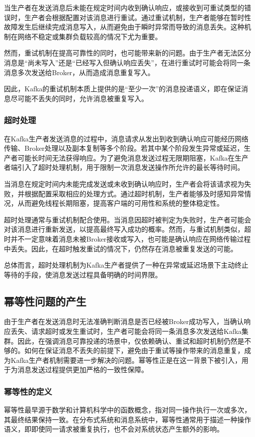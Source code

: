 当生产者在发送消息后未能在规定时间内收到确认响应，或接收到可重试类型的错误时，生产者会根据配置对该消息进行重试。通过重试机制，生产者能够在暂时性故障发生后继续完成消息写入，从而避免由于瞬时异常而导致的消息丢失。这种机制在网络不稳定或集群负载较高的情况下尤为重要。

然而，重试机制在提高可靠性的同时，也可能带来新的问题。由于生产者无法区分消息是“尚未写入”还是“已经写入但确认响应丢失”，在进行重试时可能会将同一条消息多次发送给Broker，从而造成消息重复写入。

因此，Kafka的重试机制本质上提供的是“至少一次”的消息投递语义，即在保证消息尽可能不丢失的同时，允许消息被重复写入。
    \subsubsection{超时处理}
在Kafka生产者发送消息的过程中，消息请求从发出到收到确认响应可能经历网络传输、Broker处理以及副本复制等多个阶段。若其中某个阶段发生异常或延迟，生产者可能长时间无法获得响应。为了避免消息发送过程无限期阻塞，Kafka在生产者端引入了超时处理机制，用于限制一次消息发送操作所允许的最长等待时间。

当消息在规定时间内未能完成发送或未收到确认响应时，生产者会将该请求视为失败，并根据配置采取相应的处理方式。通过超时机制，生产者能够及时感知异常情况，从而避免线程长期阻塞，提高客户端的可用性和系统的整体稳定性。

超时处理通常与重试机制配合使用。当消息因超时被判定为失败时，生产者可能会对该消息进行重新发送，以提高最终写入成功的概率。然而，与重试机制类似，超时并不一定意味着消息未被Broker接收或写入，也可能是确认响应在网络传输过程中丢失。因此，在超时触发重试的情况下，仍然存在消息被重复发送的可能。

总体而言，超时处理机制为Kafka生产者提供了一种在异常或延迟场景下主动终止等待的手段，使消息发送过程具备明确的时间界限。
\subsection{幂等性问题的产生}
由于生产者在发送消息时无法准确判断消息是否已经被Broker成功写入，当确认响应丢失、请求超时或发生重试时，生产者可能会将同一条消息多次发送给Kafka集群。因此，在强调消息可靠投递的场景中，仅依赖确认、重试和超时机制仍然是不够的。如何在保证消息不丢失的前提下，避免由于重试等操作带来的消息重复，成为Kafka生产者机制需要进一步解决的问题。幂等性正是在这一背景下被引入，用于为消息发送过程提供更加严格的一致性保障。
    \subsubsection{幂等性的定义}
幂等性最早源于数学和计算机科学中的函数概念\cite{Gray1993TransactionProcessing}，指对同一操作执行一次或多次，其最终结果保持一致。在分布式系统和消息系统中，幂等性通常用于描述一种操作语义，即即使同一请求被重复执行，也不会对系统状态产生额外的影响。

